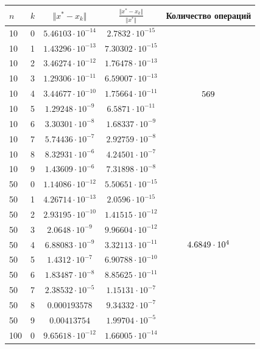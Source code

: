 \documentclass[english]{article}
\begin{document}
\begin{center}
  \begin{longtable}{l|l|c|c|c}
    \(n\) & \(k\) & \(\Vert x^* - x_k \Vert\) & \(\frac{\Vert x^* - x_k \Vert}{\Vert x^* \Vert}\) & Количество операций\\
    \hline
    10 & 0 & \(5.46103\cdot 10^{-14} \)& \(2.7832\cdot 10^{-15}\) & \\
    10 & 1 & \(1.43296\cdot 10^{-13} \)& \(7.30302\cdot 10^{-15}\) & \\
    10 & 2 & \(3.46274\cdot 10^{-12} \)& \(1.76478\cdot 10^{-13}\) & \\
    10 & 3 & \(1.29306\cdot 10^{-11} \)& \(6.59007\cdot 10^{-13}\) & \\
    10 & 4 & \(3.44677\cdot 10^{-10} \)& \(1.75664\cdot 10^{-11}\) & \({\large 569}\) \\
    10 & 5 & \(1.29248\cdot 10^{-9} \)& \(6.5871\cdot 10^{-11}\) & \\
    10 & 6 & \(3.30301\cdot 10^{-8} \)& \(1.68337\cdot 10^{-9}\) & \\
    10 & 7 & \(5.74436\cdot 10^{-7} \)& \(2.92759\cdot 10^{-8}\) & \\
    10 & 8 & \(8.32931\cdot 10^{-6} \)& \(4.24501\cdot 10^{-7}\) & \\
    10 & 9 & \(1.43609\cdot 10^{-6} \)& \(7.31898\cdot 10^{-8}\) & \\
    \hline
    50 & 0 & \(1.14086\cdot 10^{-12} \)& \(5.50651\cdot 10^{-15}\) & \\
    50 & 1 & \(4.26714\cdot 10^{-13} \)& \(2.0596\cdot 10^{-15}\) & \\
    50 & 2 & \(2.93195\cdot 10^{-10} \)& \(1.41515\cdot 10^{-12}\) & \\
    50 & 3 & \(2.0648\cdot 10^{-9}  \)& \(9.96604\cdot 10^{-12}\) & \\
    50 & 4 & \(6.88083\cdot 10^{-9} \)& \(3.32113\cdot 10^{-11}\) & \({\large 4.6849 \cdot 10^4}\) \\
    50 & 5 & \(1.4312\cdot 10^{-7}  \)& \(6.90788\cdot 10^{-10}\) & \\
    50 & 6 & \(1.83487\cdot 10^{-8} \)& \(8.85625\cdot 10^{-11}\) & \\
    50 & 7 & \(2.38532\cdot 10^{-5} \)& \(1.15131\cdot 10^{-7}\) & \\
    50 & 8 & \(0.000193578 \)& \(9.34332\cdot 10^{-7}\) & \\
    50 & 9 & \(0.00413754  \)& \(1.99704\cdot 10^{-5}\) & \\
    \hline
    100 & 0 & \(9.65618\cdot 10^{-12} \)& \(1.66005\cdot 10^{-14}\) & \\

\end{longtable}
\end{center}
\end{document}
